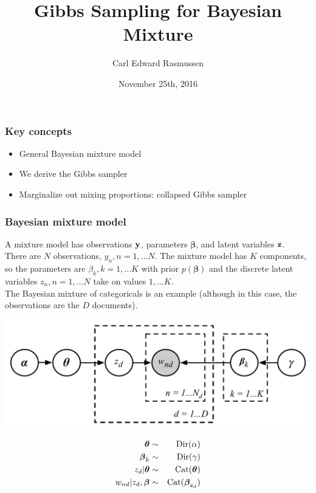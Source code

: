 

\title{Gibbs Sampling for Bayesian Mixture}
\author{Carl Edward Rasmussen}
\date{November 25th, 2016}




\begin{frame}
\titlepage
\end{frame}


\begin{frame}
\frametitle{Key concepts}

\begin{itemize}
\item General Bayesian mixture model
\item We derive the Gibbs sampler
\item Marginalize out mixing proportions: collapsed Gibbs sampler
\end{itemize}

\end{frame}


\begin{frame}
\frametitle{Bayesian mixture model}

A mixture model has observations ${\bf y}$, parameters
$\boldsymbol\beta$, and latent variables ${\bf z}$.\\[1ex]

There are $N$ observations, $y_n, n=1,\ldots N$. The mixture model has $K$
components, so the parameters are $\beta_k, k=1,\ldots K$ with prior
$p(\boldsymbol\beta)$ and the
discrete latent variables $z_n, n=1,\ldots N$ take on values $1,\dots
K$.\\[1ex]

The Bayesian mixture of categoricals is an example (although in this
case, the observations are the $D$ documents).

\begin{minipage}{0.7\linewidth}
\centerline{\includegraphics[width=0.9\linewidth]{bayes_mix_categorical_model}}
\end{minipage}
\begin{minipage}{0.29\linewidth}
{\small
\begin{eqnarray*}
\boldsymbol{\theta} & \sim & \mathrm{Dir}(\alpha) \\
\boldsymbol{\beta}_k & \sim & \mathrm{Dir}(\gamma) \\
z_d | \boldsymbol{\theta} & \sim & \rm{Cat}(\boldsymbol{\theta})\\
w_{nd} | z_d, \boldsymbol{\beta} & \sim & \rm{Cat}(\boldsymbol{\beta}_{z_d})
\end{eqnarray*}
}
\end{minipage}
\end{frame}



